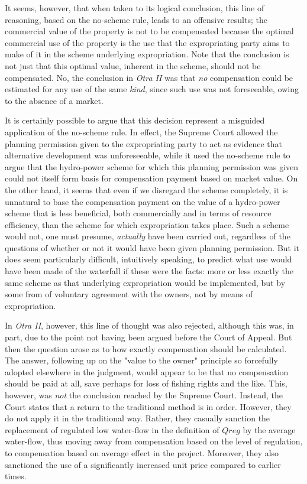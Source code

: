 It seems, however, that when taken to its logical conclusion, this line of reasoning, based on the no-scheme rule, leads to an offensive results; the commercial value of the property is not to be compensated because the optimal commercial use of the property is the use that the expropriating party aims to make of it in the scheme underlying expropriation. Note that the conclusion is not just that this optimal value, inherent in the scheme, should not be compensated. No, the conclusion in \emph{Otra II} was that \emph{no} compensation could be estimated for any use of the same \emph{kind}, since such use was not foreseeable, owing to the absence of a market.

It is certainly possible to argue that this decision represent a misguided application of the no-scheme rule. In effect, the Supreme Court allowed the planning permission given to the expropriating party to act as evidence that alternative development was unforeseeable, while it used the no-scheme rule to argue that the hydro-power scheme for which this planning permission was given could not itself form basis for compensation payment based on market value.  On the other hand, it seems that even if we disregard the scheme completely, it is unnatural to base the compensation payment on the value of a hydro-power scheme that is less beneficial, both commercially and in terms of resource efficiency, than the scheme for which expropriation takes place. Such a scheme would not, one must presume, \emph{actually} have been carried out, regardless of the questions of whether or not it would have been given planning permission. But it does seem particularly difficult, intuitively speaking, to predict what use would have been made of the waterfall if these were the facts: more or less exactly the same scheme as that underlying expropriation would be implemented, but by some from of voluntary agreement with the owners, not by means of expropriation. 

In \emph{Otra II}, however, this line of thought was also rejected, although this was, in part, due to the point not having been argued before the Court of Appeal. But then the question arose as to how exactly compensation should be calculated. The answer, following up on the "value to the owner" principle so forcefully adopted elsewhere in the judgment, would appear to be that no compensation should be paid at all, save perhaps for loss of fishing rights and the like. This, however, was \emph{not} the conclusion reached by the Supreme Court. Instead, the Court states that a return to the traditional method is in order. However, they do not apply it in the traditional way. Rather, they casually sanction the replacement of regulated low water-flow in the definition of $Qreg$ by the average water-flow, thus moving away from compensation based on the level of regulation, to compensation based on average effect in the project. Moreover, they also sanctioned the use of a significantly increased unit price compared to earlier times.

